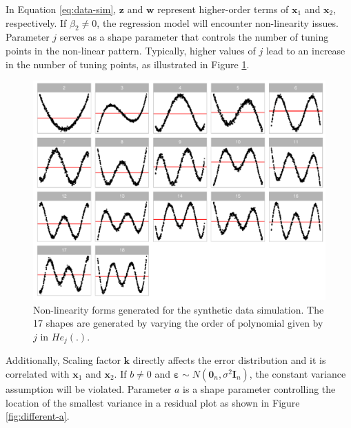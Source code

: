 \documentclass[]{interact}
\theoremstyle{plain}%
\theoremstyle{definition}
\theoremstyle{remark}
\begin{document}
In Equation \ref{eq:data-sim}, \(\boldsymbol{z}\) and \(\boldsymbol{w}\)
represent higher-order terms of \(\boldsymbol{x}_1\) and
\(\boldsymbol{x}_2\), respectively. If \(\beta_2 \neq 0\), the
regression model will encounter non-linearity issues. Parameter \(j\)
serves as a shape parameter that controls the number of tuning points in
the non-linear pattern. Typically, higher values of \(j\) lead to an
increase in the number of tuning points, as illustrated in Figure
\ref{fig:different-j}.

\begin{figure}[!h]

{\centering \includegraphics[width=1\linewidth]{paper_files/figure-latex/different-j-1} 

}

\caption{Non-linearity forms generated for the synthetic data simulation. The 17 shapes are generated by varying the order of polynomial given by $j$ in $He_j(.)$.}\label{fig:different-j}
\end{figure}

Additionally, Scaling factor \(\boldsymbol{k}\) directly affects the
error distribution and it is correlated with \(\boldsymbol{x}_1\) and
\(\boldsymbol{x}_2\). If \(b \neq 0\) and
\(\boldsymbol{\varepsilon} \sim N(\boldsymbol{0}_n, \sigma^2\boldsymbol{I}_n)\),
the constant variance assumption will be violated. Parameter \(a\) is a
shape parameter controlling the location of the smallest variance in a
residual plot as shown in Figure \ref{fig:different-a}.
\end{document}
